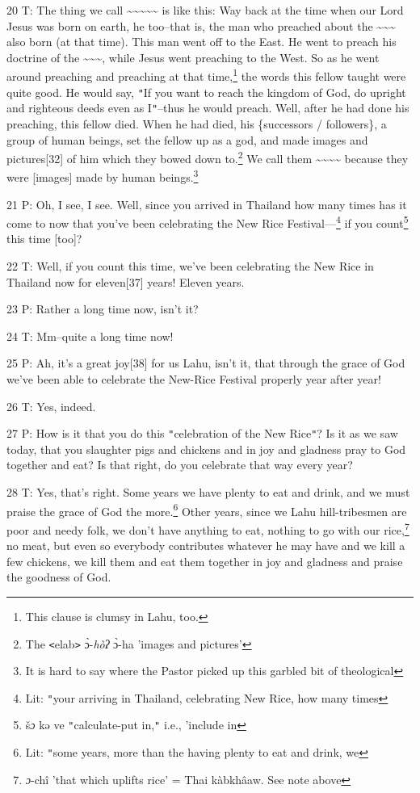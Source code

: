 20 T: The thing we call \textasciitilde{}\textasciitilde{}\textasciitilde{}\textasciitilde{}\textasciitilde{}
is like this: Way back at the time when our Lord Jesus was born on earth, he too--that
is, the man who preached about the \textasciitilde{}\textasciitilde{}\textasciitilde{}
also born (at that time). This man went off to the East. He went to preach his
doctrine of the \textasciitilde{}\textasciitilde{}\textasciitilde{}, while Jesus
went preaching to the West. So as he went around preaching and preaching at that
time,\footnote{This clause is clumsy in Lahu, too.} the words this fellow taught were quite good. He would say, \texttt{"}If
you want to reach the kingdom of God, do upright and righteous deeds even as I\texttt{"}--thus
he would preach. Well, after he had done his preaching, this fellow died. When
he had died, his \{successors / followers\}, a group of human beings, set the fellow
up as a god, and made images and pictures[32] of him which they bowed down to.\footnote{The \texttt{<}elab\texttt{>} ɔ̀-\textit{hòʔ} ɔ̀-ha 'images and pictures'}
We call them \textasciitilde{}\textasciitilde{}\textasciitilde{}\textasciitilde{}
because they were [images] made by human beings.\footnote{It is hard to say where the Pastor picked up this garbled bit of theological}

21 P: Oh, I see, I see. Well, since you arrived in Thailand how many times has
it come to now that you've been celebrating the New Rice Festival---\footnote{Lit: \texttt{"}your arriving in Thailand, celebrating New Rice, how many times} if you
count\footnote{š\emph{ɔ} kə ve \texttt{"}calculate-put in,\texttt{"} i.e., 'include in} this time [too]?

22 T: Well, if you count this time, we've been celebrating the New Rice in Thailand
now for eleven[37] years! Eleven years.

23 P: Rather a long time now, isn't it?

24 T: Mm--quite a long time now!

25 P: Ah, it's a great joy[38] for us Lahu, isn't it, that through the grace of
God we've been able to celebrate the New-Rice Festival properly year after year!

26 T: Yes, indeed.

27 P: How is it that you do this \texttt{"}celebration of the New Rice\texttt{"}?
Is it as we saw today, that you slaughter pigs and chickens and in joy and gladness
pray to God together and eat? Is that right, do you celebrate that way every year?

28 T: Yes, that's right. Some years we have plenty to eat and drink, and we must
praise the grace of God the more.\footnote{Lit: \texttt{"}some years, more than the having plenty to eat and drink, we} Other years, since we Lahu hill-tribesmen
are poor and needy folk, we don't have anything to eat, nothing to go with our
rice,\footnote{\emph{ɔ}-chî 'that which uplifts rice' = Thai kàbkhâaw. See note above} no meat, but even so everybody contributes whatever he may have and we
kill a few chickens, we kill them and eat them together in joy and gladness and
praise the goodness of God.


